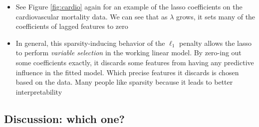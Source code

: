 \documentclass{article}
\begin{document}
\begin{itemize}
\item See Figure \ref{fig:cardio} again for an example of the lasso coefficients
  on the cardiovascular mortality data. We can see that as $\lambda$ grows, it
  sets many of the coefficients of lagged features to zero

\item In general, this sparsity-inducing behavior of the $\ell_1$ penalty allows
  the lasso to perform \emph{variable selection} in the working linear model. By
  zero-ing out some coefficients exactly, it discards some features from having
  any predictive influence in the fitted model. Which precise features it
  discards is chosen based on the data. Many people like sparsity because it
  leads to better interpretability  
\end{itemize}

\subsection{Discussion: which one?}
\end{document}
